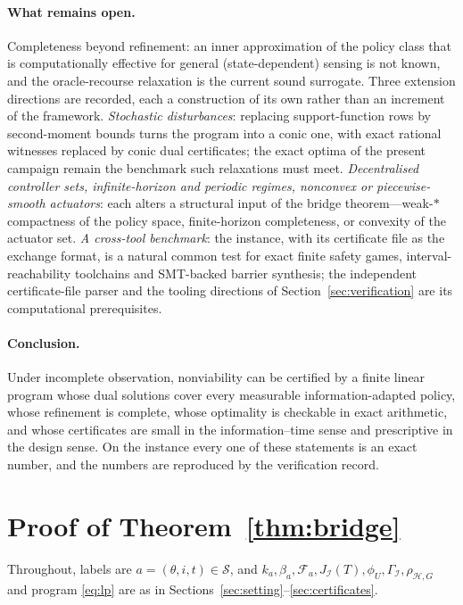 \documentclass[11pt,a4paper]{article}
\theoremstyle{plain}
\theoremstyle{definition}
\theoremstyle{remark}
\newcommand{\calI}{\mathcal{I}}
\newcommand{\calH}{\mathcal{H}}
\newcommand{\calF}{\mathcal{F}}
\newcommand{\calS}{\mathscr{S}}
\newcommand{\J}{J_{\calI}(T)}
\newcommand{\Gam}{\Gamma_{\calI}}
\newcommand{\rhoHG}{\rho_{\calH,G}}
\begin{document}
\paragraph{What remains open.}
Completeness beyond refinement: an inner approximation of the policy class that is computationally effective for general (state-dependent) sensing is not known, and the oracle-recourse relaxation is the current sound surrogate. Three extension directions are recorded, each a construction of its own rather than an increment of the framework. \emph{Stochastic disturbances}: replacing support-function rows by second-moment bounds turns the program into a conic one, with exact rational witnesses replaced by conic dual certificates; the exact optima of the present campaign remain the benchmark such relaxations must meet. \emph{Decentralised controller sets, infinite-horizon and periodic regimes, nonconvex or piecewise-smooth actuators}: each alters a structural input of the bridge theorem---weak-$\ast$ compactness of the policy space, finite-horizon completeness, or convexity of the actuator set. \emph{A cross-tool benchmark}: the instance, with its certificate file as the exchange format, is a natural common test for exact finite safety games, interval-reachability toolchains and SMT-backed barrier synthesis; the independent certificate-file parser and the tooling directions of Section~\ref{sec:verification} are its computational prerequisites.

\paragraph{Conclusion.}
Under incomplete observation, nonviability can be certified by a finite linear program whose dual solutions cover every measurable information-adapted policy, whose refinement is complete, whose optimality is checkable in exact arithmetic, and whose certificates are small in the information--time sense and prescriptive in the design sense. On the instance every one of these statements is an exact number, and the numbers are reproduced by the verification record.
\appendix

\section{Proof of Theorem~\ref{thm:bridge}}\label{app:bridge}

Throughout, labels are $a=(\theta,i,t)\in\calS$, and $k_a,\beta_a,\calF_a,\J,\phi_U,\Gam,\rhoHG$ and program \eqref{eq:lp} are as in Sections~\ref{sec:setting}--\ref{sec:certificates}.
\end{document}
